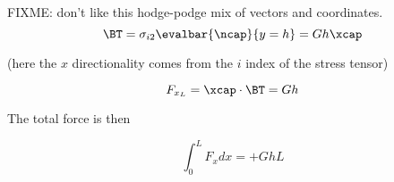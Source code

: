 FIXME: don't like this hodge-podge mix of vectors and coordinates.
\begin{equation}\label{eqn:continuumL11:770}
\BT = \sigma_{i 2} \evalbar{\ncap}{y = h} = G h \xcap
\end{equation}

(here the $x$ directionality comes from the $i$ index of the stress tensor)

\begin{equation}\label{eqn:continuumL11:790}
F_{x_L} = \xcap \cdot \BT = G h
\end{equation}

The total force is then

\begin{equation}\label{eqn:continuumL11:810}
\int_0^L F_x dx = + G h L
\end{equation}

\EndNoBibArticle
